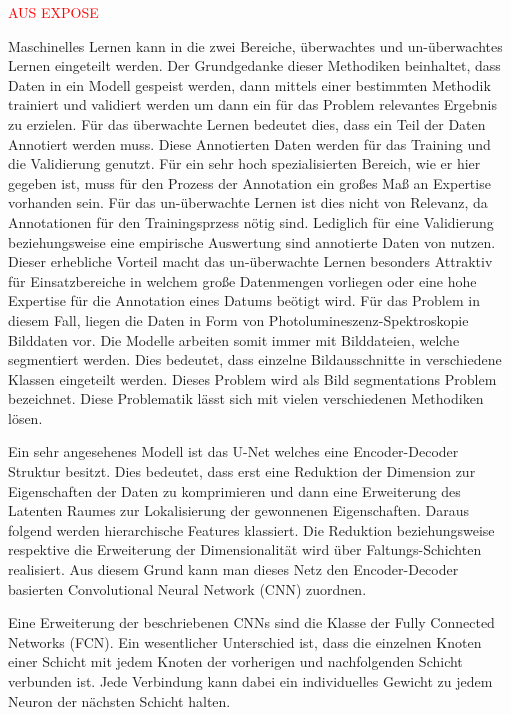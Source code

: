 \textcolor{red}{AUS EXPOSE}


Maschinelles Lernen kann in die zwei Bereiche, überwachtes und un-überwachtes Lernen eingeteilt werden. Der Grundgedanke dieser Methodiken beinhaltet, dass Daten in ein Modell gespeist werden, dann mittels einer bestimmten Methodik trainiert und validiert werden um dann ein für das Problem relevantes Ergebnis zu erzielen. \cite{long2019}
Für das überwachte Lernen bedeutet dies, dass ein Teil der Daten Annotiert werden muss. Diese Annotierten Daten werden für das Training und die Validierung genutzt. Für ein sehr hoch spezialisierten Bereich, wie er hier gegeben ist, muss für den Prozess der Annotation ein großes Maß an Expertise vorhanden sein. 
Für das un-überwachte Lernen ist dies nicht von Relevanz, da Annotationen für den Trainingsprzess nötig sind. Lediglich für eine Validierung beziehungsweise eine empirische Auswertung sind annotierte Daten von nutzen. Dieser erhebliche Vorteil macht das un-überwachte Lernen besonders Attraktiv für Einsatzbereiche in welchem große Datenmengen vorliegen oder eine hohe Expertise für die Annotation eines Datums beötigt wird.
Für das Problem in diesem Fall, liegen die Daten in Form von Photolumineszenz-Spektroskopie Bilddaten vor. \cite{pl_spectro_1997}
Die Modelle arbeiten somit immer mit Bilddateien, welche segmentiert werden. Dies bedeutet, dass einzelne Bildausschnitte in verschiedene Klassen eingeteilt werden. 
Dieses Problem wird als Bild segmentations Problem bezeichnet. Diese Problematik lässt sich mit vielen verschiedenen Methodiken lösen. 


Ein sehr angesehenes Modell ist das U-Net \cite{Ronneberger.18.05.2015} welches eine Encoder-Decoder Struktur besitzt. Dies bedeutet, dass erst eine Reduktion der Dimension zur Eigenschaften der Daten zu komprimieren und dann eine Erweiterung des Latenten Raumes zur Lokalisierung der gewonnenen Eigenschaften. Daraus folgend werden hierarchische Features klassiert. Die Reduktion beziehungsweise respektive die Erweiterung der Dimensionalität wird über Faltungs-Schichten realisiert. Aus diesem Grund kann man dieses Netz den Encoder-Decoder basierten Convolutional Neural Network (CNN) zuordnen.

Eine Erweiterung der beschriebenen CNNs sind die Klasse der Fully Connected Networks (FCN). Ein wesentlicher Unterschied  ist, dass die einzelnen Knoten einer Schicht mit jedem Knoten der vorherigen und nachfolgenden Schicht verbunden ist. Jede Verbindung kann dabei ein individuelles Gewicht zu jedem Neuron der nächsten Schicht halten. 

